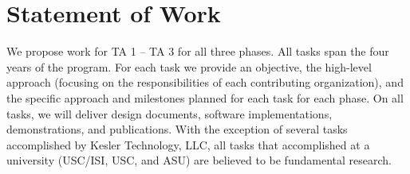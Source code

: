 \section{Statement of Work}
We propose work for TA 1 – TA 3 for all three phases. All tasks span the four years of the program. For each task we provide an objective, the high-level approach (focusing on the responsibilities of each contributing organization), and the specific approach and milestones planned for each task for each phase. On all tasks, we will deliver design documents, software implementations, demonstrations, and publications. With the exception of several tasks accomplished by Kesler Technology, LLC, all tasks that accomplished at a university (USC/ISI, USC, and ASU) are believed to be fundamental research.   
{\scriptsize

\begin{longtable} {|p{\textwidth} | }



\end{longtable}}
